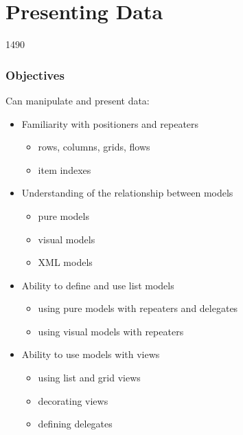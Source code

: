 %
%
%
%

\section{Presenting Data}

\begin{slide}{1490}\frametitle{Objectives}

Can manipulate and present data:

\begin{itemize}
\item Familiarity with positioners and repeaters
  \begin{itemize}
  \item rows, columns, grids, flows
  \item item indexes
  \end{itemize}
\item Understanding of the relationship between models
  \begin{itemize}
  \item pure models
  \item visual models
  \item XML models
  \end{itemize}
\item Ability to define and use list models
  \begin{itemize}
  \item using pure models with repeaters and delegates
  \item using visual models with repeaters
  \end{itemize}
\item Ability to use models with views
  \begin{itemize}
  \item using list and grid views
  \item decorating views
  \item defining delegates
  \end{itemize}
\end{itemize}

\end{slide}






